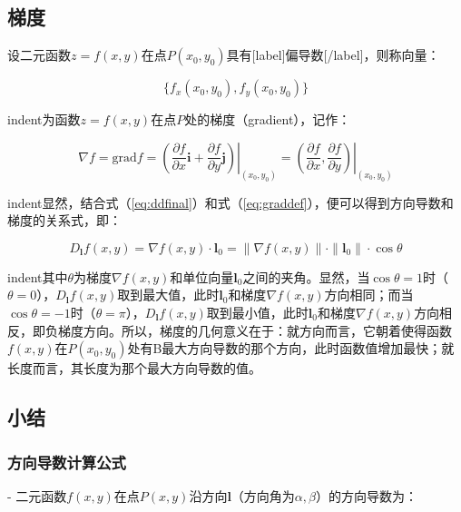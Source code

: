 \documentclass[UTF8,nofonts]{ctexart}
\begin{document}
\subsection*{梯度}

设二元函数$z=f(x,y)$在点$P(x_0,y_0)$具有[label]偏导数[/label]，则称向量：

\begin{equation}
\big\{f_x(x_0,y_0),f_y(x_0,y_0)\big\}
\end{equation}

indent为函数$z=f(x,y)$在点$P$处的梯度（gradient），记作：

\begin{equation}
\label{eq:graddef}
\nabla f=\text{grad}f=\left.\left(\dfrac{\partial f}{\partial x}\boldsymbol{i}+\dfrac{\partial f}{\partial y}\boldsymbol{j}\right)\right|_{(x_0,y_0)}=\left.\left(\dfrac{\partial f}{\partial x},\dfrac{\partial f}{\partial y}\right)\right|_{(x_0,y_0)}
\end{equation}

indent显然，结合式（\ref{eq:ddfinal}）和式（\ref{eq:graddef}），便可以得到方向导数和梯度的关系式，即：

\begin{equation}
D_{\boldsymbol{l}}f(x,y)=\nabla f(x,y)\cdot \boldsymbol{l}_0=\|\nabla f(x,y)\|\cdot\|\boldsymbol{l}_0\|\cdot\cos\theta
\end{equation}

indent其中$\theta$为梯度$\nabla f(x,y)$和单位向量$\boldsymbol{l}_0$之间的夹角。显然，当$\cos\theta=1$时（$\theta=0$），$D_{\boldsymbol{l}}f(x,y)$取到最大值，此时$\boldsymbol{l}_0$和梯度$\nabla f(x,y)$方向相同；而当$\cos\theta=-1$时（$\theta=\pi$），$D_{\boldsymbol{l}}f(x,y)$取到最小值，此时$\boldsymbol{l}_0$和梯度$\nabla f(x,y)$方向相反，即负梯度方向。所以，梯度的几何意义在于：就方向而言，它朝着使得函数$f(x,y)$在$P(x_0,y_0)$处有B最大方向导数的那个方向，此时函数值增加最快；就长度而言，其长度为那个最大方向导数的值。

\subsection*{小结}

\subsubsection*{方向导数计算公式}

- 二元函数$f(x,y)$在点$P(x,y)$沿方向$\boldsymbol{l}$（方向角为$\alpha,\beta$）的方向导数为：
\end{document}
